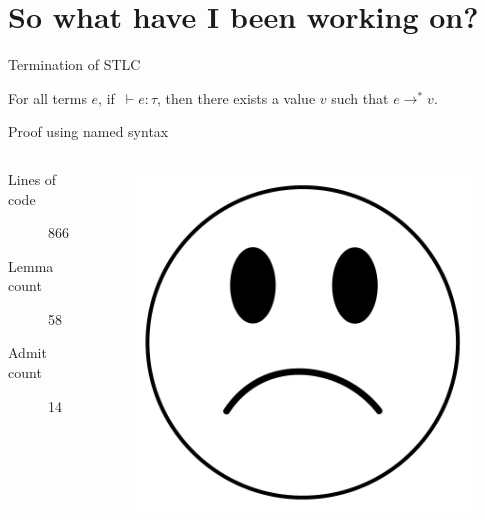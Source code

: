 \documentclass[17pt,aspectratio=169]{beamer}
\begin{document}
\section{So what have I been working on?}

\begin{frame}{Termination of STLC}
    \begin{theorem}
        For all terms $e$, if $\,\vdash e : \tau$, then there exists a value $v$ such that $e\rightarrow^* v$.
    \end{theorem}
\end{frame}

\begin{frame}{Proof using named syntax}
    \begin{columns}
        \begin{description}
            \item[Lines of code] 866
            \item[Lemma count] 58
            \item[Admit count] 14
        \end{description}
        \begin{figure}[H]
            \centering
            \includegraphics[scale=0.2]{./img/sad2.jpeg}
        \end{figure}
    \end{columns}
\end{frame}
\end{document}
